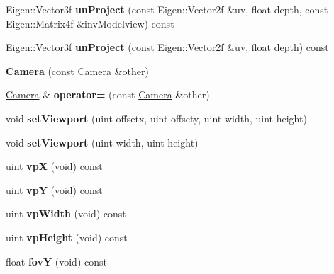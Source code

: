 \begin{DoxyCompactItemize}
Eigen\+::\+Vector3f {\bfseries un\+Project} (const Eigen\+::\+Vector2f \&uv, float depth, const Eigen\+::\+Matrix4f \&inv\+Modelview) const
\item 
\mbox{\label{class_camera_a38f070824241e555744a9ce14601c30e}} 
Eigen\+::\+Vector3f {\bfseries un\+Project} (const Eigen\+::\+Vector2f \&uv, float depth) const
\item 
\mbox{\label{class_camera_ad491e80e8096db31be3d6095475ff3f3}} 
{\bfseries Camera} (const \hyperlink{class_camera}{Camera} \&other)
\item 
\mbox{\label{class_camera_a489dc5ad5611fa2da0c8461f93b4652e}} 
\hyperlink{class_camera}{Camera} \& {\bfseries operator=} (const \hyperlink{class_camera}{Camera} \&other)
\item 
\mbox{\label{class_camera_ad33fa87402ee280ac0194fd062b570bd}} 
void {\bfseries set\+Viewport} (uint offsetx, uint offsety, uint width, uint height)
\item 
\mbox{\label{class_camera_a7c1b847ed9fd5dfd3dcf3017160b1825}} 
void {\bfseries set\+Viewport} (uint width, uint height)
\item 
\mbox{\label{class_camera_a0462fcbd95a3e7cfef772cec82b58abe}} 
uint {\bfseries vpX} (void) const
\item 
\mbox{\label{class_camera_ad5c56d0e29df685bbe62bc9b77a52b1c}} 
uint {\bfseries vpY} (void) const
\item 
\mbox{\label{class_camera_a284a34e208b7ddbd41fb306647f6818f}} 
uint {\bfseries vp\+Width} (void) const
\item 
\mbox{\label{class_camera_a03cd0c3febe3a446b1c7bdbc060d3031}} 
uint {\bfseries vp\+Height} (void) const
\item 
\mbox{\label{class_camera_a0942e5c257ca57e6e6e000bde9dc0595}} 
float {\bfseries fovY} (void) const
\item 
\mbox{\label{class_camera_af65bcf0c1ccc9df655c453f34d3c7e2c}} 

\end{DoxyCompactItemize}
